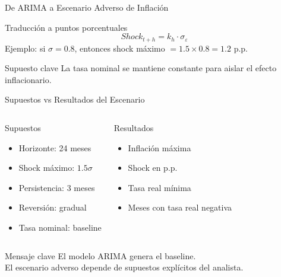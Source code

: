\documentclass[10pt,aspectratio=169]{beamer}
\begin{document}
\begin{frame}{De ARIMA a Escenario Adverso de Inflación}
\begin{block}{Traducción a puntos porcentuales}
\[
Shock_{t+h} = k_h \cdot \sigma_{\varepsilon}
\]
\small
Ejemplo: si $\sigma = 0.8$, entonces shock máximo $= 1.5 \times 0.8 = 1.2$ p.p.
\end{block}

\vspace{0.3cm}

\begin{alertblock}{Supuesto clave}
La tasa nominal se mantiene constante para aislar el efecto inflacionario.
\end{alertblock}

\end{frame}

\begin{frame}{Supuestos vs Resultados del Escenario}

\begin{columns}

\begin{block}{Supuestos}
\begin{itemize}
\item Horizonte: 24 meses
\item Shock máximo: $1.5\sigma$
\item Persistencia: 3 meses
\item Reversión: gradual
\item Tasa nominal: baseline
\end{itemize}
\end{block}

\begin{block}{Resultados}
\begin{itemize}
\item Inflación máxima
\item Shock en p.p.
\item Tasa real mínima
\item Meses con tasa real negativa
\end{itemize}
\end{block}

\end{columns}

\vspace{0.4cm}

\begin{alertblock}{Mensaje clave}
El modelo ARIMA genera el baseline. \\
El escenario adverso depende de supuestos explícitos del analista.
\end{alertblock}

\end{frame}
\end{document}
